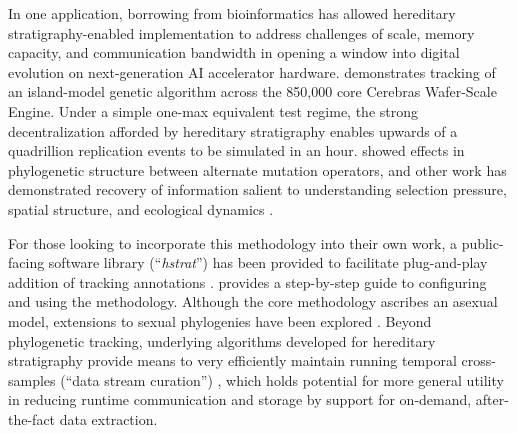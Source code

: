 In one application, borrowing from bioinformatics has allowed hereditary stratigraphy-enabled implementation to address challenges of scale, memory capacity, and communication bandwidth in opening a window into digital evolution on next-generation AI accelerator hardware.
\citet{moreno2024trackable} demonstrates tracking of an island-model genetic algorithm across the 850,000 core Cerebras Wafer-Scale Engine.
Under a simple one-max equivalent test regime, the strong decentralization afforded by hereditary stratigraphy enables upwards of a quadrillion replication events to be simulated in an hour.
\citet{moreno2024trackable} showed effects in phylogenetic structure between alternate mutation operators, and other work has demonstrated recovery of information salient to understanding selection pressure, spatial structure, and ecological dynamics \citep{moreno2025ecology}.

For those looking to incorporate this methodology into their own work, a public-facing software library (``\textit{hstrat}'') has been provided to facilitate plug-and-play addition of tracking annotations  \citep{moreno2022hstrat}.
\citet{moreno2024guide} provides a step-by-step guide to configuring and using the methodology.
Although the core methodology ascribes an asexual model, extensions to sexual phylogenies have been explored \citep{moreno2024methods}.
Beyond phylogenetic tracking, underlying algorithms developed for hereditary stratigraphy provide means to very efficiently maintain running temporal cross-samples (``data stream curation'') \citep{moreno2024structured}, which holds potential for more general utility in reducing runtime communication and storage by support for on-demand, after-the-fact data extraction.
